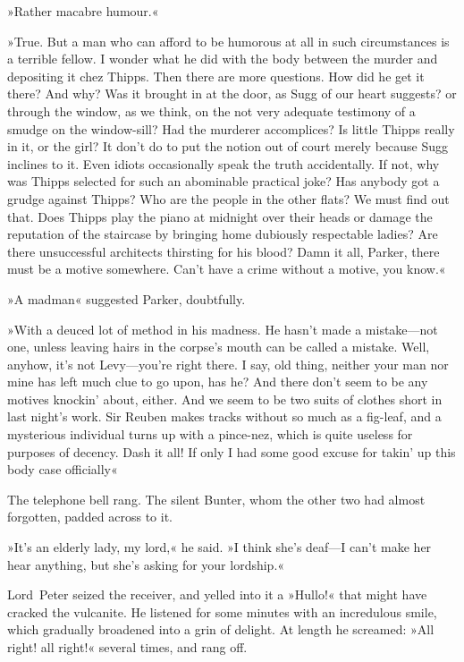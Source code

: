 »Rather macabre humour.«

»True. But a man who can afford to be humorous at all in such circumstances is a terrible fellow. I wonder what he did with the body between the murder and depositing it chez Thipps. Then there are more questions. How did he get it there? And why? Was it brought in at the door, as Sugg of our heart suggests? or through the window, as we think, on the not very adequate testimony of a smudge on the window-sill? Had the murderer accomplices? Is little Thipps really in it, or the girl? It don't do to put the notion out of court merely because Sugg inclines to it. Even idiots occasionally speak the truth accidentally. If not, why was Thipps selected for such an abominable practical joke? Has anybody got a grudge against Thipps? Who are the people in the other flats? We must find out that. Does Thipps play the piano at midnight over their heads or damage the reputation of the staircase by bringing home dubiously respectable ladies? Are there unsuccessful architects thirsting for his blood? Damn it all, Parker, there must be a motive somewhere. Can't have a crime without a motive, you know.«

»A madman\longdash« suggested Parker, doubtfully.

»With a deuced lot of method in his madness. He hasn't made a mistake—not one, unless leaving hairs in the corpse's mouth can be called a mistake. Well, anyhow, it's not Levy—you're right there. I say, old thing, neither your man nor mine has left much clue to go upon, has he? And there don't seem to be any motives knockin' about, either. And we seem to be two suits of clothes short in last night's work. Sir Reuben makes tracks without so much as a fig-leaf, and a mysterious individual turns up with a pince-nez, which is quite useless for purposes of decency. Dash it all! If only I had some good excuse for takin' up this body case officially\longdash«

The telephone bell rang. The silent Bunter, whom the other two had almost forgotten, padded across to it.

»It's an elderly lady, my lord,« he said. »I think she's deaf—I can't make her hear anything, but she's asking for your lordship.«

Lord~Peter seized the receiver, and yelled into it a »Hullo!« that might have cracked the vulcanite. He listened for some minutes with an incredulous smile, which gradually broadened into a grin of delight. At length he screamed: »All right! all right!« several times, and rang off.

